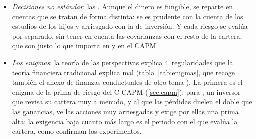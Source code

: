 \documentclass[11pt]{article}
\begin{document}
\begin{itemize}
\begin{itemize}
  \item el : el descuento de la teoría estándar es \emph{exponencial}, el único que es dinámicamente consistente, mientras que las personas descuentan mucho el futuro inmediato y poco el lejano, con un descuento \emph{cuasihiperbólico}\nocite{Laibson1997Golden} . En las finanzas personales, lleva a ahorrar menos de lo planeado para la jubilación y a buscar compromisos que lo eviten.
  \end{itemize}
\item \emph{Decisiones no estándar}: las \nocite{Thaler1985Mental,Thaler1999Mental}. Aunque el dinero es fungible, se reparte en cuentas que se tratan de forma distinta: se es prudente con la cuenta de los estudios de los hijos y arriesgado con la de inversión. Y cada riesgo se evalúa por separado, sin tener en cuenta las covarianzas con el resto de la cartera, que son justo lo que importa en  y en el CAPM\nocite{BarberisHuang2001}.
\item \emph{Los enigmas}: la teoría de las perspectivas explica 4~regularidades que la teoría financiera tradicional explica mal (tabla~\ref{tab:enigmas}, que recoge también el anexo de finanzas conductuales de otro tema ). La primera es el enigma de la prima de riesgo del C-CAPM (\ref{sec:capm}): para \textcite{BenartziThaler1995Myopic}, un inversor que revisa su cartera muy a menudo, y al que las pérdidas duelen el doble que las ganancias, ve las acciones muy arriesgadas y exige por ellas una prima alta; la exigencia baja cuanto más largo es el periodo con el que evalúa la cartera, como confirman los experimentos.
\end{itemize}
\end{document}
